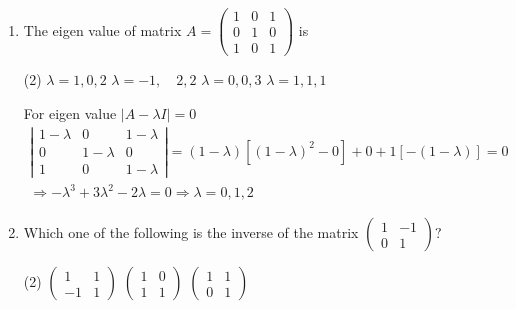 \begin{enumerate}[label=\color{ocre}\textbf{\arabic*.}]
\begin{answer}
$$\begin{array}{l}
\begin{array}{lll}
2 & 1 & \alpha \\
4 & 3 & 5 \\
1 & 2 & 7
\end{array}\right|=0 \\
\Rightarrow \alpha(8-3)-5(4-1)+7(6-4)=0 \\
\Rightarrow \alpha=\frac{1}{5}
\end{array}
$$
Therefore, there is only one value of $\alpha$ for which infinite solutions exist.	
\end{answer}
\item The eigen value of matrix $A=\left(\begin{array}{lll}1 & 0 & 1 \\ 0 & 1 & 0 \\ 1 & 0 & 1\end{array}\right)$ is
\begin{tasks}(2)
	\task[\textbf{a.}]$\lambda=1,0,2$  
	\task[\textbf{b.}]$\lambda=-1, \quad 2,2$
	\task[\textbf{c.}]$\lambda=0,0,3$ 
	\task[\textbf{d.}]$\lambda=1,1,1$ 
\end{tasks}
\begin{answer}
 For eigen value $|A-\lambda I|=0$
$$
\begin{array}{l}
\left|\begin{array}{ccc}
1-\lambda & 0 & 1-\lambda \\
0 & 1-\lambda & 0 \\
1 & 0 & 1-\lambda
\end{array}\right|=(1-\lambda)\left[(1-\lambda)^{2}-0\right]+0+1[-(1-\lambda)]=0 \\
\Rightarrow-\lambda^{3}+3 \lambda^{2}-2 \lambda=0 \Rightarrow \lambda=0,1,2
\end{array}
$$	
\end{answer}
\item  Which one of the following is the inverse of the matrix $\left(\begin{array}{cc}1 & -1 \\ 0 & 1\end{array}\right)?$
\begin{tasks}(2)
	\task[\textbf{a.}]$\left(\begin{array}{cc}1 & 1 \\ -1 & 1\end{array}\right)$  
	\task[\textbf{b.}]$\left(\begin{array}{ll}1 & 0 \\ 1 & 1\end{array}\right)$
	\task[\textbf{c.}] $\left(\begin{array}{ll}1 & 1 \\ 0 & 1\end{array}\right)$

\end{tasks}
\end{enumerate}

